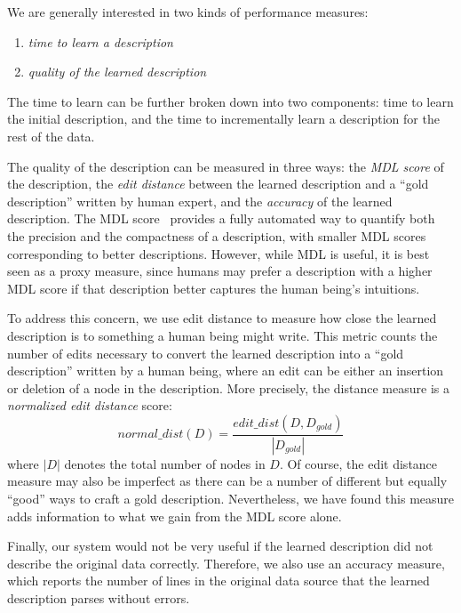 We are generally interested in two kinds of performance measures: 
\begin{enumerate}
\item {\em time to learn a description} 
\item {\em quality of the learned description} 
\end{enumerate}

The time to learn can be further
broken down into two components: time to learn the initial description,
and the time to incrementally learn a description for the rest of the data.

The quality of the description can be measured in three ways:
the {\em MDL score} of the description, the {\em edit distance} between the learned
description and a ``gold description'' written by human expert, and the {\em accuracy}
of the learned description.  The MDL score~\cite{mdlbook} 
provides a fully automated way to quantify both the
precision and the compactness of a description, with smaller MDL scores corresponding to better descriptions.
However, while MDL is useful, it is best seen as a proxy measure, since humans may prefer a description with a higher MDL score if that description better captures the human being's intuitions. 


To address this concern, we use edit distance to measure how close the learned description is to something a human being might write.
This metric counts the number of edits necessary to convert the learned description into a ``gold description'' written by a human being, where an edit can be either an insertion or deletion of a node in the description. 
More precisely, the distance measure is a {\em normalized edit distance} score:
\[normal\_dist(D) = \frac{edit\_dist(D, D_{gold})}{|D_{gold}|}\]
where $|D|$ denotes the total number of nodes in $D$.
Of course, the edit distance measure may also be imperfect as there can be a number of different but equally ``good'' ways 
to craft a gold description.  Nevertheless, we have found this measure
adds information to what we gain from the MDL score alone.

Finally, our system would not be very useful if the learned description 
did not describe the original data correctly. Therefore, we also use an accuracy measure, 
which reports the number of lines in the original data source that the learned description parses without errors.


